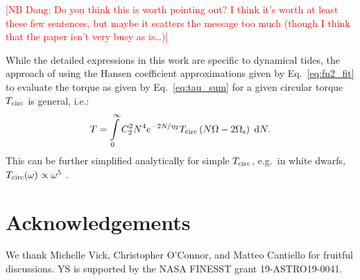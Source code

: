 \documentclass[
        fleqn,
        usenatbib,
    ]{mnras}
\newcommand*{\p}[1]{\left(#1\right)}
\begin{document}
\textcolor{red}{[NB Dong: Do you think this is worth pointing out? I think it's
worth at least these few sentences, but maybe it scatters the message too much
(though I think that the paper isn't very busy as is\dots)]}

While the detailed expressions in this work are specific to dynamical tides, the
approach of using the Hansen coefficient approximations given by
Eq.~\eqref{eq:fn2_fit} to evaluate the torque as given by
Eq.~\eqref{eq:tau_sum} for a given circular torque $T_{\rm circ}$ is general,
i.e.:
\begin{equation}
    T = \int\limits_0^\infty C_2^2 N^{4}e^{-2N / \eta_2}T_{\rm circ}
        \p{N\Omega - 2\Omega_{\rm s}}\;\mathrm{d}N.
\end{equation}
This can be further simplified analytically for simple $T_{\rm circ}$, e.g.\ in
white dwarfs, $T_{\rm circ}(\omega) \propto \omega^5$
\citep{fuller2012dynamical}.


\section{Acknowledgements}

We thank Michelle Vick, Christopher O'Connor, and Matteo Cantiello for fruitful
discussions. YS is supported by the NASA FINESST grant 19-ASTRO19-0041.





\bsp
\label{lastpage} %
\end{document}
